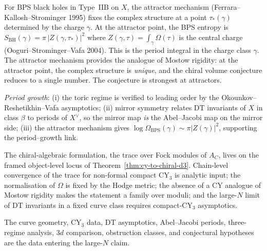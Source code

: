 \begin{remark}
\label{rem:chiral-volume-attractor}
For BPS black holes in Type~IIB on $X$, the attractor mechanism
(Ferrara--Kallosh--Strominger 1995) fixes the complex structure at a
point $\tau_*(\gamma)$ determined by the charge $\gamma$. At the
attractor point, the BPS entropy is
$S_{\mathrm{BH}}(\gamma) = \pi\,\lvert Z(\gamma, \tau_*)\rvert^2$
where $Z(\gamma, \tau) = \int_\gamma \Omega(\tau)$ is the central
charge (Ooguri--Strominger--Vafa 2004). This is the period integral in
the charge class $\gamma$. The attractor mechanism provides the
analogue of Mostow rigidity: at the attractor point, the complex
structure is \emph{unique}, and the chiral volume conjecture reduces to
a single number. The conjecture is strongest at attractors.
\end{remark}

\begin{remark}
\label{rem:chiral-volume-evidence}
\emph{Period growth}: (i) the toric regime is verified to leading order by
the Okounkov--Reshetikhin--Vafa asymptotics; (ii) mirror symmetry
relates DT invariants of $X$ in class $\beta$ to periods of $X^\vee$,
so the mirror map \emph{is} the Abel--Jacobi map on the mirror side;
(iii) the attractor mechanism gives
$\log\Omega_{\mathrm{BPS}}(\gamma) \sim \pi\lvert Z(\gamma)\rvert^2$,
supporting the period--growth link.

The chiral-algebraic formulation, the trace over Fock modules of $A_C$,
lives on the framed object-level locus of
Theorem~\textup{\ref{thm:cy-to-chiral-d3}}. Chain-level convergence of
the trace for non-formal compact CY$_3$ is analytic input; the
normalisation of $\Omega$ is fixed by the Hodge metric; the absence of a
CY analogue of Mostow rigidity makes the statement a family over moduli;
and the large-$N$ limit of DT invariants in a fixed curve class requires
compact-CY$_3$ asymptotics.

\noindent The curve geometry, CY$_3$ data, DT asymptotics,
Abel--Jacobi periods, three-regime analysis, \(3d\) comparison,
obstruction classes, and conjectural hypotheses are the data entering
the large-\(N\) claim.
\end{remark}

